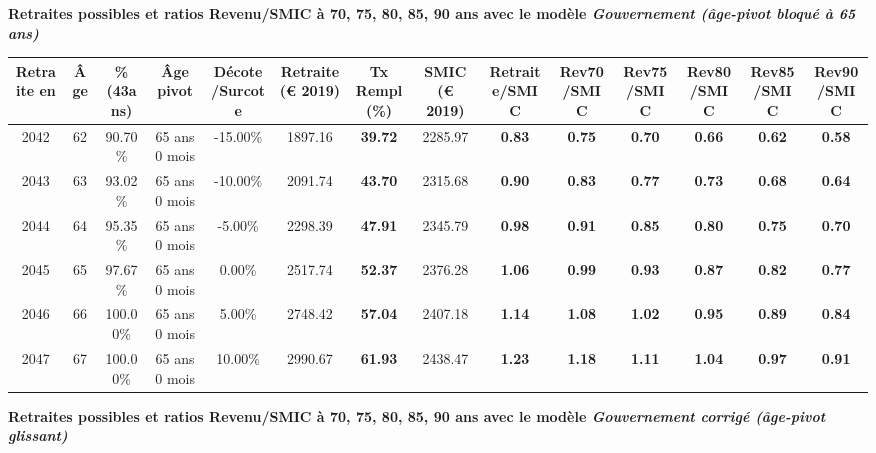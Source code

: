 {\bf \noindent Retraites possibles et ratios Revenu/SMIC à 70, 75, 80, 85, 90 ans avec le modèle \emph{Gouvernement (âge-pivot bloqué à 65 ans)}}  
 
\begin{adjustbox}{max width=\textwidth} 
\begin{tabular}[htb]{|c|c||c|c|c||c|c||c||c|c|c|c|c|c|} 
\hline 
 Retraite en &  Âge &  \%(43ans) &  Âge pivot &  Décote/Surcote &  Retraite (\euro{} 2019) &  Tx Rempl(\%) &  SMIC (\euro{} 2019) &  Retraite/SMIC &  Rev70/SMIC &  Rev75/SMIC &  Rev80/SMIC &  Rev85/SMIC &  Rev90/SMIC \\ 
\hline \hline 
 2042 &  62 &  90.70\% &  65 ans 0 mois &  -15.00\% &  1897.16 &  {\bf 39.72} &  2285.97 &  {\bf {\color{red} 0.83}} &  {\bf {\color{red} 0.75}} &  {\bf {\color{red} 0.70}} &  {\bf {\color{red} 0.66}} &  {\bf {\color{red} 0.62}} &  {\bf {\color{red} 0.58}} \\ 
\hline 
 2043 &  63 &  93.02\% &  65 ans 0 mois &  -10.00\% &  2091.74 &  {\bf 43.70} &  2315.68 &  {\bf {\color{red} 0.90}} &  {\bf {\color{red} 0.83}} &  {\bf {\color{red} 0.77}} &  {\bf {\color{red} 0.73}} &  {\bf {\color{red} 0.68}} &  {\bf {\color{red} 0.64}} \\ 
\hline 
 2044 &  64 &  95.35\% &  65 ans 0 mois &  -5.00\% &  2298.39 &  {\bf 47.91} &  2345.79 &  {\bf {\color{red} 0.98}} &  {\bf {\color{red} 0.91}} &  {\bf {\color{red} 0.85}} &  {\bf {\color{red} 0.80}} &  {\bf {\color{red} 0.75}} &  {\bf {\color{red} 0.70}} \\ 
\hline 
 2045 &  65 &  97.67\% &  65 ans 0 mois &  0.00\% &  2517.74 &  {\bf 52.37} &  2376.28 &  {\bf 1.06} &  {\bf {\color{red} 0.99}} &  {\bf {\color{red} 0.93}} &  {\bf {\color{red} 0.87}} &  {\bf {\color{red} 0.82}} &  {\bf {\color{red} 0.77}} \\ 
\hline 
 2046 &  66 &  100.00\% &  65 ans 0 mois &  5.00\% &  2748.42 &  {\bf 57.04} &  2407.18 &  {\bf 1.14} &  {\bf 1.08} &  {\bf 1.02} &  {\bf {\color{red} 0.95}} &  {\bf {\color{red} 0.89}} &  {\bf {\color{red} 0.84}} \\ 
\hline 
 2047 &  67 &  100.00\% &  65 ans 0 mois &  10.00\% &  2990.67 &  {\bf 61.93} &  2438.47 &  {\bf 1.23} &  {\bf 1.18} &  {\bf 1.11} &  {\bf 1.04} &  {\bf {\color{red} 0.97}} &  {\bf {\color{red} 0.91}} \\ 
\hline 
\hline 
\end{tabular} 
\end{adjustbox} 
 
 \vspace{0.1cm} 
{\bf \noindent Retraites possibles et ratios Revenu/SMIC à 70, 75, 80, 85, 90 ans avec le modèle \emph{Gouvernement corrigé (âge-pivot glissant)}}  
 
